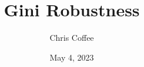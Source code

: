 \documentclass[8pt]{extarticle}
\begin{document}

    \title{Gini Robustness}
    \author{Chris Coffee}
    \date{May 4, 2023}
    \maketitle

%
%
%
%
%
%
\end{document}
